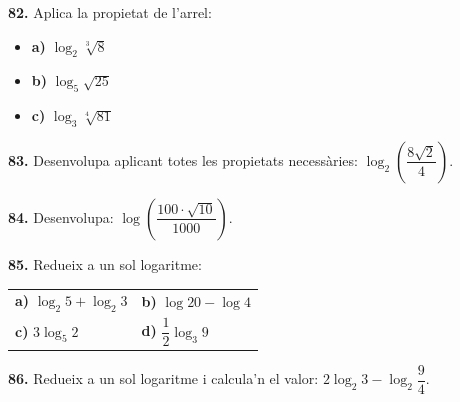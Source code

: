 \documentclass[13pt,a4paper]{extarticle}
\begin{document}
\par\noindent\begin{minipage}{\linewidth}
\textbf{82.} Aplica la propietat de l'arrel:\par

\begin{itemize}[leftmargin=0pt,itemsep=3pt,topsep=3pt,parsep=0pt,label={}]
\item \textbf{a)} $\log_2 \sqrt[3]{8}$
\item \textbf{b)} $\log_5\sqrt{25}$
\item \textbf{c)} $\log_3\sqrt[4]{81}$
\end{itemize}
\end{minipage}\par\vspace{1.6mm}
\par\noindent\begin{minipage}{\linewidth}
\textbf{83.} Desenvolupa aplicant totes les propietats necessàries: $\log_2\left(\dfrac{8\sqrt2}{4}\right)$.\par
\end{minipage}\par\vspace{1.6mm}
\par\noindent\begin{minipage}{\linewidth}
\textbf{84.} Desenvolupa: $\log\left(\dfrac{100\cdot\sqrt{10}}{1000}\right)$.\par
\end{minipage}\par\vspace{1.6mm}
\par\noindent\begin{minipage}{\linewidth}
\textbf{85.} Redueix a un sol logaritme:\par

\begin{tabular}{@{}p{.46\linewidth}p{.46\linewidth}@{}}
\textbf{a)} $\log_2 5+\log_2 3$ & \textbf{b)} $\log 20-\log 4$ \\[2pt]
\textbf{c)} $3\log_5 2$ & \textbf{d)} $\dfrac12 \log_3 9$ \\[2pt]
\end{tabular}\par
\end{minipage}\par\vspace{1.6mm}
\par\noindent\begin{minipage}{\linewidth}
\textbf{86.} Redueix a un sol logaritme i calcula'n el valor: $2\log_2 3-\log_2 \dfrac{9}{4}$.\par
\end{minipage}\par\vspace{1.6mm}
\end{document}
